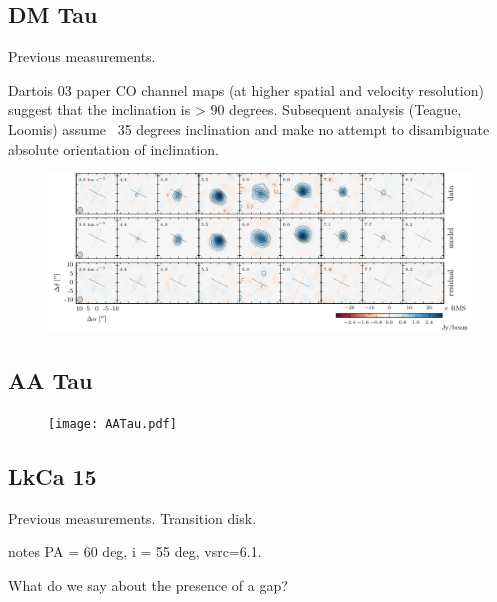 \documentclass{aastex6}
\begin{document}

\subsection{DM Tau}
Previous measurements.

Dartois 03 paper CO channel maps (at higher spatial and velocity resolution) suggest that the inclination is > 90 degrees. Subsequent analysis (Teague, Loomis) assume ~35 degrees inclination and make no attempt to disambiguate absolute orientation of inclination.

\begin{figure}[htb]
\begin{center}
  \includegraphics{DMTau.pdf}
  \end{center}
\end{figure}

\subsection{AA Tau}

\begin{figure}[htb]
\begin{center}
  \texttt{[image: AATau.pdf]}
  \end{center}
\end{figure}

\subsection{LkCa 15}
Previous measurements. Transition disk.

\citep{vandermarel15} notes PA = 60 deg, i = 55 deg,  vsrc=6.1.

What do we say about the presence of a gap?
\end{document}
